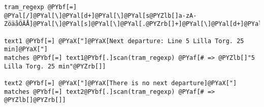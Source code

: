 \begin{Verbatim}[commandchars=@\[\]]
tram_regexp @PYbf[=] @PYal[/]@PYal[\]@PYal[d+]@PYal[\]@PYal[s@PYZlb[]a-zA-ZöäåÖÄÅ]@PYal[\]@PYal[s]@PYal[\]@PYal[.@PYZrb[]+]@PYal[\]@PYal[d+]@PYal[\]@PYal[smin]@PYal[/]

text1 @PYbf[=] @PYaX["]@PYaX[Next departure: Line 5 Lilla Torg. 25 min]@PYaX["]
matches @PYbf[=] text1@PYbf[.]scan(tram_regexp) @PYaf[# => @PYZlb[]"5 Lilla Torg. 25 min"@PYZrb[]]

text2 @PYbf[=] @PYaX["]@PYaX[There is no next departure]@PYaX["]
matches @PYbf[=] text2@PYbf[.]scan(tram_regexp) @PYaf[# => @PYZlb[]@PYZrb[]]
\end{Verbatim}
